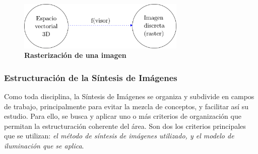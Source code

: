 \begin{figure}[h]
\includegraphics[width=8cm]{Img/CPD/grafica3.png}
\centering
\caption{\textbf{\footnotesize{Rasterización de una imagen}}}
\label{fig:grafica3}
\end{figure}

\subsubsection{Estructuración de la Síntesis de Imágenes}
Como toda disciplina, la Síntesis de Imágenes se organiza y subdivide en campos de trabajo, principalmente para evitar la mezcla de conceptos, y facilitar así su estudio. Para ello, se busca y aplicar uno o más criterios de organización que permitan la estructuración coherente del área. Son dos los criterios principales que se utilizan: \textit{el método de síntesis de imágenes utilizado, y el modelo de iluminación que se aplica}.

